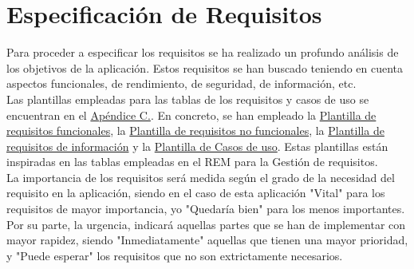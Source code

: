 \chapter{Especificación de Requisitos}
\label{enlaceespecificacion}

Para proceder a especificar los requisitos se ha realizado un profundo análisis de los objetivos de la aplicación. Estos requisitos se han buscado teniendo en cuenta aspectos funcionales, de rendimiento, de seguridad, de información, etc.
\\

Las plantillas empleadas para las tablas de los requisitos y casos de uso se encuentran en el \hyperref[plantillas]{Apéndice C.}. En concreto, se han empleado la \hyperref[enlaceFRQX]{Plantilla de requisitos funcionales}, la \hyperref[enlaceNFRX]{Plantilla de requisitos no funcionales}, la \hyperref[enlaceIRQX]{Plantilla de requisitos de información} y la \hyperref[enlaceUCX]{Plantilla de Casos de uso}.
Estas plantillas están inspiradas en las tablas empleadas en el REM \cite{rem} para la Gestión de requisitos.
\\

La importancia de los requisitos será medida según el grado de la necesidad del requisito en la aplicación, siendo en el caso de esta aplicación "Vital" para los requisitos de mayor importancia, yo "Quedaría bien" para los menos importantes. Por su parte, la urgencia, indicará aquellas partes que se han de implementar con mayor rapidez, siendo "Inmediatamente" aquellas que tienen una mayor prioridad, y "Puede esperar" los requisitos que no son extrictamente necesarios.






